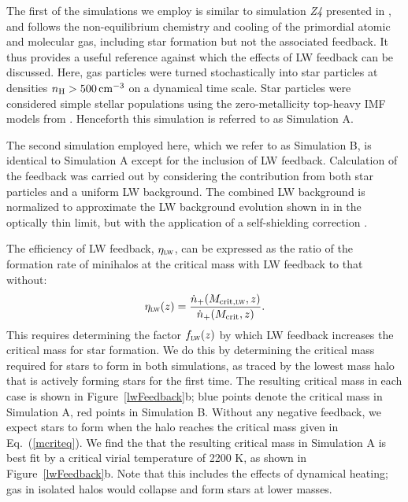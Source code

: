 \documentclass{thesis}
\newcommand{\RefFig}[1]{\mbox{Figure~\ref{#1}}}
\newcommand{\RefEq}[1]{\mbox{Eq.~(\ref{#1})}}
\begin{document}
The first of the simulations we employ is similar to simulation {\it
  Z4} presented in \citet{PawlikMilosavljevicBromm2011}, and follows
the non-equilibrium chemistry and cooling of the primordial atomic and
molecular gas, including star formation but not the associated
feedback.  It thus provides a useful reference against which the
effects of LW feedback can be discussed. Here, gas particles were
turned stochastically into star particles at densities $n_{\rm H} >
500 \,{\rm cm}^{-3}$ on a dynamical time scale. Star particles were
considered simple stellar populations using the zero-metallicity
top-heavy IMF models from \citet{Schaerer2003}.  Henceforth this
simulation is referred to as Simulation A.

The second simulation employed here, which we refer to as Simulation
B, is identical to Simulation A except for the inclusion of LW
feedback.  Calculation of the feedback was carried out by considering
the contribution from both star particles and a uniform LW background.
The combined LW background is normalized to approximate the LW
background evolution shown in \citet{GreifBromm2006} in the optically
thin limit, but with the application of a self-shielding correction
\citep{Wolcott-GreenHaimanBryan2011}.


The efficiency of LW feedback, $\eta_{\textsc{lw}}$, can be expressed
as the ratio of the formation rate of minihalos at the critical mass
with LW feedback to that without:
\begin{equation}
  \eta_{\textsc{lw}}(z) = \frac{ \dot{n}_{+}(M_{\rm crit, \textsc{lw}},
    z) }{ \dot{n}_{+}(M_{\rm crit}, z)}.
\end{equation}
This requires determining the factor $f_{\textsc{lw}}(z)$ by which LW
feedback increases the critical mass for star formation.  We do this
by determining the critical mass required for stars to form in both
simulations, as traced by the lowest mass halo that is actively
forming stars for the first time.  The resulting critical mass in each
case is shown in \RefFig{lwFeedback}b; blue points denote the critical
mass in Simulation A, red points in Simulation B.  Without any
negative feedback, we expect stars to form when the halo reaches the
critical mass given in \RefEq{mcriteq}.  We find the that the resulting critical
mass in Simulation A is best fit by a critical virial temperature of
2200 K, as shown in \RefFig{lwFeedback}b.  Note that this includes the
effects of dynamical heating; gas in isolated halos would collapse and
form stars at lower masses.
\end{document}
